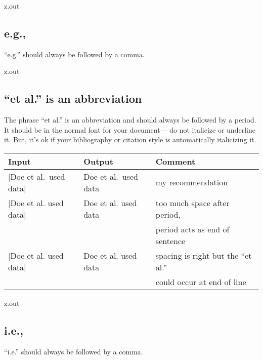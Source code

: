 \MyIO


\begin{VerbatimOut}{z.out}

\subsection{e.g.,}

``e.g.'' should always be followed by a comma.
\end{VerbatimOut}

\MyIO


\begin{VerbatimOut}{z.out}

\subsection{``et al.'' is an abbreviation}

The phrase ``et al.''
is an abbreviation
and should always be followed by a period.
It should be in the normal font for your document---%
do not italicize or underline it.
But,
it's ok if your bibliography
or citation style
is automatically italicizing it.

\begin{inlinetable}
  \begin{tabular}{@{}lll@{}}
    \toprule
    \textbf{Input}&           \textbf{Output}&        \textbf{Comment}\\
    \midrule
    |Doe et al.~used data|&   Doe et al.~used data&   my recommendation\\
    |Doe et al. used data|&   Doe et al. used data&   too much space after period,\\
    &                         &                       period acts as end of sentence\\
    |Doe et al\@. used data|& Doe et al\@. used data& spacing is right but the ``et al.''\\
    &                         &                       could occur at end of line\\
    \bottomrule
  \end{tabular}
\end{inlinetable}
\end{VerbatimOut}

\MyIO


\begin{VerbatimOut}{z.out}

\subsection{i.e.,}

``i.e.'' should always be followed by a comma.
\end{VerbatimOut}

\MyIO
